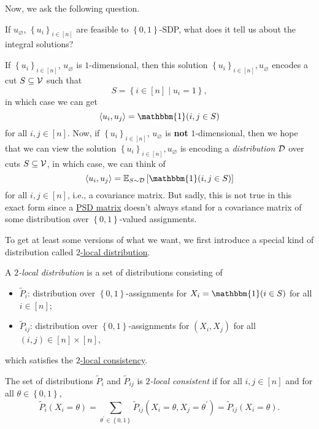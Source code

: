 Now, we ask the following question.

\begin{problem*}
	If \(u_\varnothing \), \(\left\{ u_{i}  \right\} _{i\in [n]}\) are feasible to \(\left\{ 0, 1 \right\} \)-SDP, what does it tell us about the integral solutions?
\end{problem*}
\begin{answer}
	If \(\left\{ u_i \right\} _{i\in [n]}\), \(u_\varnothing \) is \(1\)-dimensional, then this solution \(\left\{ u_i \right\} _{i\in [n]}, u_\varnothing\) encodes a cut \(S \subseteq \mathcal{\MakeUppercase{v}} \) such that
	\[
		S = \left\{ i\in [n] \mid u_i = 1 \right\},
	\]
	in which case we can get
	\[
		\left\langle u_i, u_j \right\rangle = \mathbbm{1}(i, j\in S)
	\]
	for all \(i, j\in [n]\). Now, if \(\left\{ u_i \right\} _{i\in [n]}\), \(u_\varnothing \) is \textbf{not} \(1\)-dimensional, then we hope that we can view the solution \(\left\{ u_i \right\} _{i\in [n]}, u_\varnothing \) is encoding a \emph{distribution} \(\mathcal{\MakeUppercase{d}} \) over cuts \(S \subseteq \mathcal{\MakeUppercase{v}} \), in which case, we can think of
	\[
		\left\langle u_i, u_j \right\rangle = \mathbb{E}_{S\sim \mathcal{\MakeUppercase{D}} }\left[ \mathbbm{1}(i, j\in S)\right]
	\]
	for all \(i, j\in [n]\), i.e., a covariance matrix. But sadly, this is not true in this exact form since a \hyperref[def:PSD]{PSD matrix} doesn't always stand for a covariance matrix of some distribution over \(\left\{ 0, 1 \right\} \)-valued assignments.
\end{answer}

To get at least some versions of what we want, we first introduce a special kind of distribution called \hyperref[def:2-local-distribution]{\(2\)-local distribution}.

\begin{definition}\label{def:2-local-distribution}
	A \emph{\(2\)-local distribution} is a set of distributions consisting of
	\begin{itemize}
		\item \(\widetilde{P} _i\): distribution over \(\left\{ 0, 1 \right\} \)-assignments for \(X_i= \mathbbm{1}(i\in S) \) for all \(i\in [n]\);
		\item \(\widetilde{P} _{ij}\): distribution over \(\left\{ 0, 1 \right\} \)-assignments for \((X_i, X_j)\) for all \((i, j)\in [n]\times [n]\),
	\end{itemize}
	which satisfies the \hyperref[def:2-local-consistency]{\(2\)-local consistency}.

	\begin{definition}\label{def:2-local-consistency}
		The set of distributions \(\widetilde{P} _i\) and \(\widetilde{P} _{ij}\) is \emph{\(2\)-local consistent} if for all \(i, j\in [n]\) and for all \(\theta \in \left\{ 0, 1 \right\} \),
		\[
			\widetilde{P} _i(X_i = \theta ) = \sum_{\theta ^\prime \in \left\{ 0, 1 \right\} } \widetilde{P} _{ij}(X_i=\theta , X_j = \theta ^\prime )= \widetilde{P} _{ij}(X_i = \theta ).
		\]
	\end{definition}

\end{definition}

